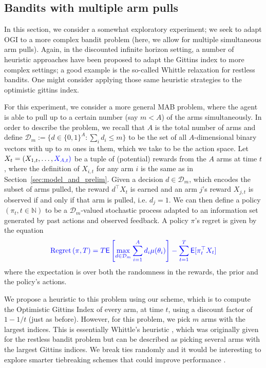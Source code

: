 \subsection{Bandits with multiple arm pulls}

In this section, we consider a somewhat exploratory experiment; we seek to adapt OGI to a more complex bandit problem (here, we allow for multiple simultaneous arm pulls). Again, in the discounted infinite horizon setting, a number of heuristic approaches have been proposed to adapt the Gittins index to more complex settings; a good example is the so-called Whittle relaxation for restless bandits. One might consider applying those same heuristic strategies to the optimistic gittins index. 

For this experiment, we consider a more general MAB problem, where the agent is able to pull up to a certain number (say $m < A$) of the arms simultaneously. In order to describe the problem, we recall that $A$ is the total number of arms and define  $\mathcal{D}_m := \{d \in \{0,1\}^A : \sum_i d_i \le m\}$ to be the set of all $A$-dimensional binary vectors with up to $m$ ones in them, which we take to be the action space. Let $X_t = (X_{1,t}, \ldots, {\color{blue}X_{A,t})}$ be a tuple of (potential) rewards from the $A$ arms at time $t$, where the definition of $X_{i,t}$ for any arm $i$ is the same as in Section~\ref{sec:model_and_prelim}. Given a decision $d \in \mathcal D_m$, which encodes the subset of arms pulled, the reward $d^\top X_t$ is earned and an arm $j$'s reward $X_{j,t}$ is observed if and only if that arm is pulled, i.e. $d_{j} = 1$. We can then define a policy $(\pi_t, t \in \mathbb{N})$ to be a $\mathcal{D}_m$-valued stochastic process adapted to an information set generated by past actions and observed feedback. 
 A policy $\pi$'s regret is given by the equation 
\[
\color{blue}
\textnormal{Regret} \left( \pi, T \right) = T  \mathsf{E} \left[ \max_{d \in \mathcal D_m}   \sum_{i=1}^A d_i \mu(\theta_i) \right] - \sum_{t=1}^T \mathsf{E}[\pi_t^\top X_t ]
\]
where the expectation is over both the randomness in the rewards, the prior and the policy's actions.

We propose a heuristic to this problem using our scheme, which is to compute the Optimistic Gittins Index of every arm, at time $t$, using a discount factor of $1-1/t$ (just as before). However, for this problem, we pick $m$ arms with the largest indices. This is essentially Whittle's heuristic \citep{whittle1988restless}, which was originally given for the restless bandit problem but can be described as picking several arms with the largest Gittins indices. {\color{blue} We break ties randomly and it would be interesting to explore smarter tiebreaking schemes that could improve performance \citep{brown2017index}}.

